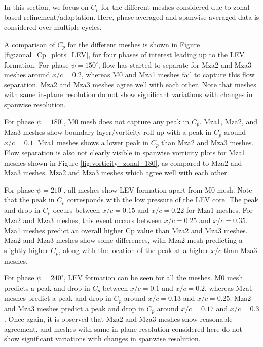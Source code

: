 
In this section, we focus on $C_p$ for the different meshes considered due to zonal-based refinement/adaptation.
Here, phase averaged and spanwise averaged data is considered over multiple cycles.

A comparison of $C_p$ for the different meshes is shown in Figure \ref{fig:zonal_Cp_plots_LEV}, for four phases of interest leading up to the LEV formation. 
For phase $\psi=150^\circ$, flow has started to separate for Mza2 and Mza3 meshes around $x/c = 0.2$, whereas M0 and Mza1 meshes fail to capture this flow separation. 
Mza2 and Mza3 meshes agree well with each other. 
Note that meshes with same in-plane resolution do not show significant variations with changes in spanwise resolution.

 
For phase $\psi=180^\circ$, M0 mesh does not capture any peak in $C_p$.
Mza1, Mza2, and Mza3 meshes show boundary layer/vorticity roll-up with a peak in $C_p$ around $x/c = 0.1$.
Mza1 meshes shows a lower peak in $C_p$ than Mza2 and Mza3 meshes. 
Flow separation is also not clearly visible in spanwise vorticity plots for Mza1 meshes shown in Figure \ref{fig:vorticity_zonal_180}, as compared to Mza2 and Mza3 meshes.
Mza2 and Mza3 meshes which agree well with each other.


For phase $\psi=210^\circ$, all meshes show LEV formation apart from M0 mesh. Note that the peak in $C_p$ corresponds with the low pressure of the LEV core.
The peak and drop in $C_p$ occurs between $x/c=0.15$ and $x/c=0.22$ for Mza1 meshes. 
For Mza2 and Mza3 meshes, this event occurs between $x/c=0.25$ and $x/c=0.35$. Mza1 meshes predict an overall higher Cp value than Mza2 and Mza3 meshes.
Mza2 and Mza3 meshes show some differences, with Mza2 mesh predicting a slightly higher $C_p$, along with the location of the peak at a higher $x/c$ than Mza3 meshes.

For phase $\psi=240^\circ$, LEV formation can be seen for all the meshes.
M0 mesh predicts a peak and drop in $C_p$ between $x/c=0.1$ and $x/c=0.2$, whereas Mza1 meshes predict a peak and drop in $C_p$ around $x/c=0.13$ and $x/c=0.25$. 
Mza2 and Mza3 meshes predict a peak and drop in $C_p$ around $x/c=0.17$ and $x/c=0.3$. 
Once again, it is observed that Mza2 and Mza3 meshes show reasonable agreement, and meshes with same in-plane resolution considered here do not show significant variations with changes in spanwise resolution.

